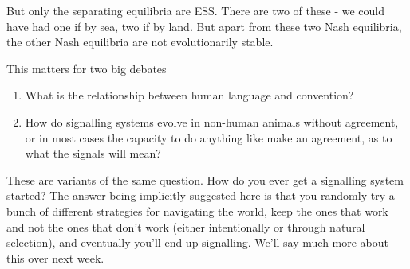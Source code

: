 \documentclass[11pt,]{article}
\providecommand{\tightlist}{%
  \setlength{\itemsep}{0pt}\setlength{\parskip}{0pt}}
\begin{document}
But only the separating equilibria are ESS. There are two of these - we
could have had one if by sea, two if by land. But apart from these two
Nash equilibria, the other Nash equilibria are not evolutionarily
stable.

This matters for two big debates

\begin{enumerate}
\def\labelenumi{\arabic{enumi}.}
\tightlist
\item
  What is the relationship between human language and convention?
\item
  How do signalling systems evolve in non-human animals without
  agreement, or in most cases the capacity to do anything like make an
  agreement, as to what the signals will mean?
\end{enumerate}

These are variants of the same question. How do you ever get a
signalling system started? The answer being implicitly suggested here is
that you randomly try a bunch of different strategies for navigating the
world, keep the ones that work and not the ones that don't work (either
intentionally or through natural selection), and eventually you'll end
up signalling. We'll say much more about this over next week.
\end{document}
